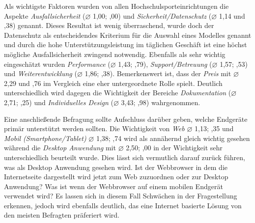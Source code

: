 Als wichtigste Faktoren wurden von allen Hochschulsporteinrichtungen die Aspekte \textit{Ausfallsicherheit} ($\varnothing$ 1,00; ,00) und \textit{Sicherheit/Datenschutz} ($\varnothing$ 1,14 und ,38) genannt. Dieses Resultat ist wenig überraschend, wurde doch der Datenschutz als entscheidendes Kriterium für die Auswahl eines Modelles genannt und durch die hohe Unterstützungsleistung im täglichen Geschäft ist eine höchst mögliche Ausfallsicherheit zwingend notwendig. Ebenfalls als sehr wichtig eingeschätzt wurden \textit{Performance} ($\varnothing$ 1,43; ,79), \textit{Support/Betreuung} ($\varnothing$ 1,57; ,53) und \textit{Weiterentwicklung} ($\varnothing$ 1,86; ,38). Bemerkenswert ist, dass der \textit{Preis} mit $\varnothing$ 2,29 und ,76 im Vergleich eine eher untergeordnete Rolle spielt. Deutlich unterschiedlich wird dagegen die Wichtigkeit der Bereiche \textit{Dokumentation} ($\varnothing$ 2,71; ,25) und \textit{Individuelles Design} ($\varnothing$ 3,43; ,98) wahrgenommen.
	
Eine anschließende Befragung sollte Aufschluss darüber geben, welche Endgeräte primär unterstützt werden sollten. Die Wichtigkeit von \textit{Web} $\varnothing$ 1,13; ,35 und \textit{Mobil (Smartphone/Tablet)} $\varnothing$ 1,38; ,74 wird als annähernd gleich wichtig gesehen während die \textit{Desktop Anwendung} mit $\varnothing$ 2,50; ,00 in der Wichtigkeit sehr unterschiedlich beurteilt wurde. Dies lässt sich vermutlich darauf zurück führen, was als Desktop Anwendung gesehen wird. Ist der Webbrowser in dem die Internetseite dargestellt wird jetzt zum Web zuzuordnen oder zur Desktop Anwendung? Was ist wenn der Webbrowser auf einem mobilen Endgerät verwendet wird? Es lassen sich in diesem Fall Schwächen in der Fragestellung erkennen, jedoch wird ebenfalls deutlich, das eine Internet basierte Lösung von den meisten Befragten präferiert wird.


